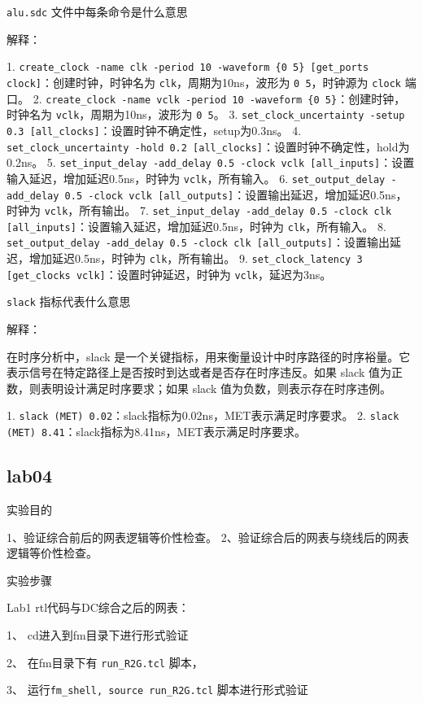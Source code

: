 \texttt{alu.sdc} 文件中每条命令是什么意思

解释：

1. \texttt{create\_clock -name clk -period 10 -waveform \{0 5\} [get\_ports clock]}：创建时钟，时钟名为 \texttt{clk}，周期为10ns，波形为 \texttt{0 5}，时钟源为 \texttt{clock} 端口。
2. \texttt{create\_clock -name vclk -period 10 -waveform \{0 5\}}：创建时钟，时钟名为 \texttt{vclk}，周期为10ns，波形为 \texttt{0 5}。
3. \texttt{set\_clock\_uncertainty -setup 0.3 [all\_clocks]}：设置时钟不确定性，setup为0.3ns。
4. \texttt{set\_clock\_uncertainty -hold 0.2 [all\_clocks]}：设置时钟不确定性，hold为0.2ns。
5. \texttt{set\_input\_delay  -add\_delay 0.5 -clock vclk [all\_inputs]}：设置输入延迟，增加延迟0.5ns，时钟为 \texttt{vclk}，所有输入。
6. \texttt{set\_output\_delay -add\_delay 0.5 -clock vclk [all\_outputs]}：设置输出延迟，增加延迟0.5ns，时钟为 \texttt{vclk}，所有输出。
7. \texttt{set\_input\_delay  -add\_delay 0.5 -clock clk [all\_inputs]}：设置输入延迟，增加延迟0.5ns，时钟为 \texttt{clk}，所有输入。
8. \texttt{set\_output\_delay -add\_delay 0.5 -clock clk [all\_outputs]}：设置输出延迟，增加延迟0.5ns，时钟为 \texttt{clk}，所有输出。
9. \texttt{set\_clock\_latency 3 [get\_clocks vclk]}：设置时钟延迟，时钟为 \texttt{vclk}，延迟为3ns。

\texttt{slack} 指标代表什么意思

解释：

在时序分析中，slack 是一个关键指标，用来衡量设计中时序路径的时序裕量。它表示信号在特定路径上是否按时到达或者是否存在时序违反。如果 slack 值为正数，则表明设计满足时序要求；如果 slack 值为负数，则表示存在时序违例。

1. \texttt{slack (MET) 0.02}：slack指标为0.02ns，MET表示满足时序要求。
2. \texttt{slack (MET) 8.41}：slack指标为8.41ns，MET表示满足时序要求。

\subsection{lab04}

实验目的

1、验证综合前后的网表逻辑等价性检查。
2、验证综合后的网表与绕线后的网表逻辑等价性检查。

实验步骤

Lab1 rtl代码与DC综合之后的网表：

1、	cd进入到fm目录下进行形式验证

2、	在fm目录下有 \texttt{run\_R2G.tcl} 脚本，

3、	运行\texttt{fm\_shell, source run\_R2G.tcl} 脚本进行形式验证

